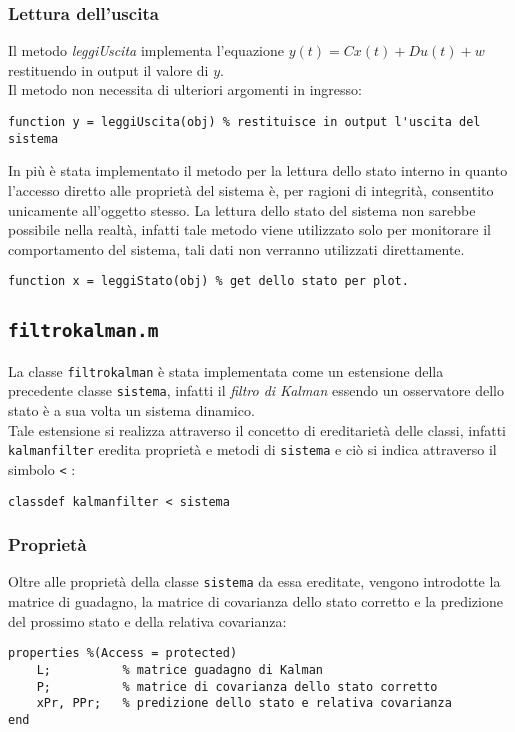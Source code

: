 \subsubsection{Lettura dell'uscita}
Il metodo \textit{leggiUscita} implementa l'equazione $y(t) = Cx(t)+Du(t)+w$ restituendo in output il valore di $y$.\\
Il metodo non necessita di ulteriori argomenti in ingresso:

\begin{lstlisting}[frame=single]
function y = leggiUscita(obj) % restituisce in output l'uscita del sistema 
\end{lstlisting}

In più è stata implementato il metodo per la lettura dello stato interno in quanto l'accesso diretto alle proprietà del sistema è, per ragioni di integrità, consentito unicamente all'oggetto stesso.
La lettura dello stato del sistema non sarebbe possibile nella realtà, infatti tale metodo viene utilizzato solo per monitorare il comportamento del sistema, tali dati non verranno utilizzati direttamente.
\begin{lstlisting}[frame=single]
function x = leggiStato(obj) % get dello stato per plot.
\end{lstlisting}

\newpage

\subsection{\texttt{filtrokalman.m}}
La classe \texttt{filtrokalman} è stata implementata come un estensione della precedente classe \texttt{sistema}, infatti il \textit{filtro di Kalman} essendo un osservatore dello stato è a sua volta un sistema dinamico.\\
Tale estensione si realizza attraverso il concetto di ereditarietà delle classi, infatti \texttt{kalmanfilter} eredita proprietà e metodi di \texttt{sistema} e ciò si indica attraverso il simbolo \texttt{<} :
\begin{lstlisting}[frame=single]
classdef kalmanfilter < sistema 
\end{lstlisting}
\subsubsection{Proprietà}
Oltre alle proprietà della classe \texttt{sistema} da essa ereditate, vengono introdotte la matrice di guadagno, la matrice di covarianza dello stato corretto e la predizione del prossimo stato e della relativa covarianza:
\begin{lstlisting}[frame=single]
properties %(Access = protected)
	L;          % matrice guadagno di Kalman
	P;          % matrice di covarianza dello stato corretto
	xPr, PPr;   % predizione dello stato e relativa covarianza
end
\end{lstlisting}
